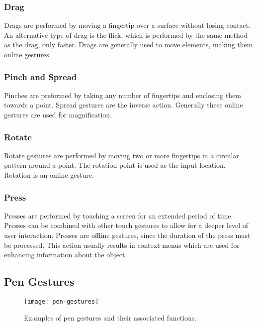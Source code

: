 \subsubsection{Drag}

Drags are performed by moving a fingertip over a surface without losing contact. 
An alternative type of drag is the flick, which is performed by the same method as the drag, only faster.
Drags are generally used to move elements, making them online gestures.

\subsubsection{Pinch and Spread}

Pinches are preformed by taking any number of fingertips and enclosing them towards a point. Spread gestures are the inverse action. Generally these online gestures are used for magnification.

\subsubsection{Rotate}

Rotate gestures are performed by moving two or more fingertips in a circular pattern around a point. The rotation point is used as the input location.
Rotation is an online gesture.

\subsubsection{Press}

Presses are performed by touching a screen for an extended period of time. 
Presses can be combined with other touch gestures to allow for a deeper level of user interaction.
Presses are offline gestures, since the duration of the press must be processed.
This action usually results in context menus which are used for enhancing information about the object.



\subsection{Pen Gestures}

\begin{figure}
\texttt{[image: pen-gestures]}
\caption{Examples of pen gestures and their associated functions.
\label{fig:pengestures}
\cite{inkgestures}}
\end{figure}

